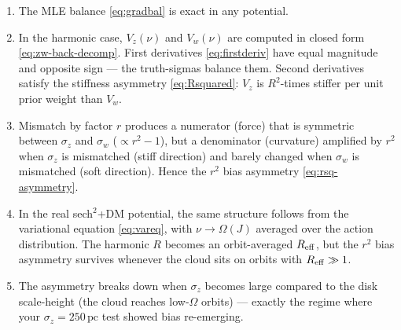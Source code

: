 \documentclass[11pt]{article}
\begin{document}
\begin{enumerate}
\item The MLE balance \eqref{eq:gradbal} is exact in any potential.
\item In the harmonic case, $V_z(\nu)$ and $V_w(\nu)$ are computed in closed form
\eqref{eq:zw-back-decomp}. First derivatives \eqref{eq:firstderiv} have equal
magnitude and opposite sign — the truth-sigmas balance them. Second derivatives
satisfy the stiffness asymmetry \eqref{eq:Rsquared}: $V_z$ is $R^2$-times stiffer
per unit prior weight than $V_w$.
\item Mismatch by factor $r$ produces a numerator (force) that is symmetric between
$\sigma_z$ and $\sigma_w$ ($\propto r^2-1$), but a denominator (curvature) amplified
by $r^2$ when $\sigma_z$ is mismatched (stiff direction) and barely changed when
$\sigma_w$ is mismatched (soft direction). Hence the $r^2$ bias asymmetry
\eqref{eq:rsq-asymmetry}.
\item In the real sech$^2$+DM potential, the same structure follows from the
variational equation \eqref{eq:vareq}, with $\nu\to\Omega(J)$ averaged over the
action distribution. The harmonic $R$ becomes an orbit-averaged $R_{\rm eff}$, but
the $r^2$ bias asymmetry survives whenever the cloud sits on orbits with
$R_{\rm eff}\gg 1$.
\item The asymmetry breaks down when $\sigma_z$ becomes large compared to the disk
scale-height (the cloud reaches low-$\Omega$ orbits) — exactly the regime where
your $\sigma_z=250\,\mathrm{pc}$ test showed bias re-emerging.
\end{enumerate}
\end{document}
